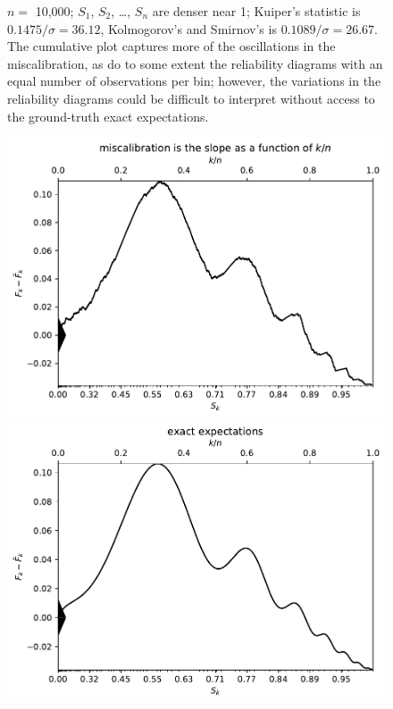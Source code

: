 \documentclass{article}
\begin{document}
\begin{figure}
\begin{centering}
\end{centering}
\caption{$n =$ 10,000; $S_1$, $S_2$, \dots, $S_n$ are denser near 1;
         Kuiper's statistic is $0.1475 / \sigma = 36.12$,
         Kolmogorov's and Smirnov's is $0.1089 / \sigma = 26.67$.
The cumulative plot captures more of the oscillations in the miscalibration,
as do to some extent the reliability diagrams with an equal number
of observations per bin; however, the variations in the reliability diagrams
could be difficult to interpret without access
to the ground-truth exact expectations.
}
\label{10000_1}
\end{figure}


\begin{figure}
\begin{centering}

\parbox{\imsize}{\includegraphics[width=\imsize]
                {./codes/unweighted/1000_10_2_1/cumulative.pdf}}
\quad\quad
\parbox{\imsize}{\includegraphics[width=\imsize]
                {./codes/unweighted/1000_10_2_1/cumulative_exact.pdf}}


\end{centering}
\end{figure}
\end{document}
